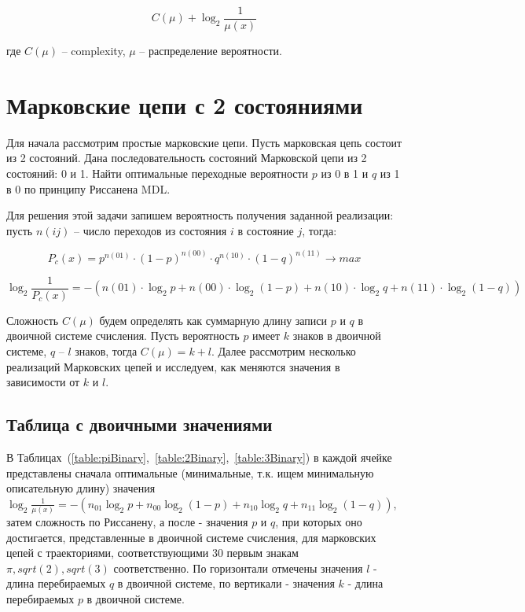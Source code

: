 \documentclass[12pt]{article}
\begin{document}
	\begin{equation}C(\mu)+\log_2{\frac{1}{\mu(x)}}\end{equation}
	
	где $C(\mu)$ -- complexity, $\mu$ -- распределение вероятности.
	
	\section*{Марковские цепи с 2 состояниями}
	Для начала рассмотрим простые марковские цепи. Пусть марковская цепь состоит из 2 состояний. Дана последовательность состояний Марковской цепи из 2 состояний: 0 и 1. Найти оптимальные переходные вероятности $p$ из 0 в 1 и $q$ из 1 в 0 по принципу Риссанена MDL. 
	
	Для решения этой задачи запишем вероятность получения заданной реализации: пусть $n(ij)$ -- число переходов из состояния $i$ в состояние $j$, тогда:
	
	\begin{equation}P_c(x) = p^{n(01)}\cdot(1-p)^{n(00)}\cdot q^{n(10)}\cdot(1-q)^{n(11)}\to max\end{equation}
	
	\begin{equation}\label{log}\log_2{\frac{1}{P_c(x)}}=-(n(01)\cdot\log_2{p}+n(00)\cdot\log_2{(1-p)}+n(10)\cdot\log_2{q}+n(11)\cdot\log_2{(1-q)})\end{equation}
	
	Сложность $C(\mu)$ будем определять как суммарную длину записи $p$ и $q$ в двоичной системе счисления. Пусть вероятность $p$ имеет $k$ знаков в двоичной системе, $q$ -- $l$ знаков, тогда $C(\mu)=k+l$. Далее рассмотрим несколько реализаций Марковских цепей и исследуем, как меняются значения в зависимости от $k$ и $l$.
	
	\subsection*{Таблица с двоичными значениями}
	В Таблицах~(\ref{table:piBinary},~\ref{table:2Binary},~\ref{table:3Binary}) в каждой ячейке представлены сначала оптимальные (минимальные, т.к. ищем минимальную описательную длину) значения $\log_2{\frac{1}{\mu(x)}}=-(n_{01}\log_2{p}+n_{00}\log_2{(1-p)}+n_{10}\log_2{q}+n_{11}\log_2{(1-q)})$, затем сложность по Риссанену, а после - значения $p$ и $q$, при которых оно достигается, представленные в двоичной системе счисления, для марковских цепей с траекториями, соответствующими 30 первым знакам $\pi, sqrt(2), sqrt(3)$ соответственно. По горизонтали отмечены значения $l$ - длина перебираемых $q$  в двоичной системе, по вертикали - значения $k$ - длина перебираемых $p$  в двоичной системе.
	
\end{document}
